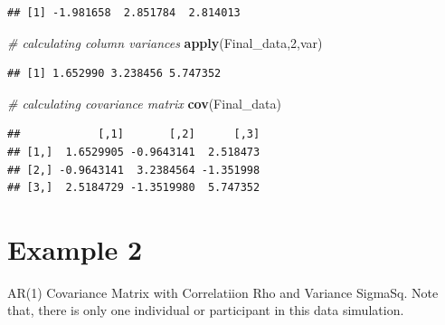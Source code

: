 \documentclass[]{book}
\newenvironment{Shaded}{\begin{snugshade}}{\end{snugshade}}
\newcommand{\CommentTok}[1]{\textcolor[rgb]{0.56,0.35,0.01}{\textit{#1}}}
\newcommand{\DecValTok}[1]{\textcolor[rgb]{0.00,0.00,0.81}{#1}}
\newcommand{\KeywordTok}[1]{\textcolor[rgb]{0.13,0.29,0.53}{\textbf{#1}}}
\newcommand{\NormalTok}[1]{#1}
\begin{document}
\begin{verbatim}
## [1] -1.981658  2.851784  2.814013
\end{verbatim}

\begin{Shaded}
\begin{Highlighting}[]
\CommentTok{# calculating column variances}
\KeywordTok{apply}\NormalTok{(Final_data,}\DecValTok{2}\NormalTok{,var)}
\end{Highlighting}
\end{Shaded}

\begin{verbatim}
## [1] 1.652990 3.238456 5.747352
\end{verbatim}

\begin{Shaded}
\begin{Highlighting}[]
\CommentTok{# calculating covariance matrix}
\KeywordTok{cov}\NormalTok{(Final_data)}
\end{Highlighting}
\end{Shaded}

\begin{verbatim}
##            [,1]       [,2]      [,3]
## [1,]  1.6529905 -0.9643141  2.518473
## [2,] -0.9643141  3.2384564 -1.351998
## [3,]  2.5184729 -1.3519980  5.747352
\end{verbatim}

\hypertarget{example-2}{%
\section{Example 2}\label{example-2}}

AR(1) Covariance Matrix with Correlatiion Rho and Variance SigmaSq. Note that, there is only one individual or participant in this data simulation.
\end{document}
